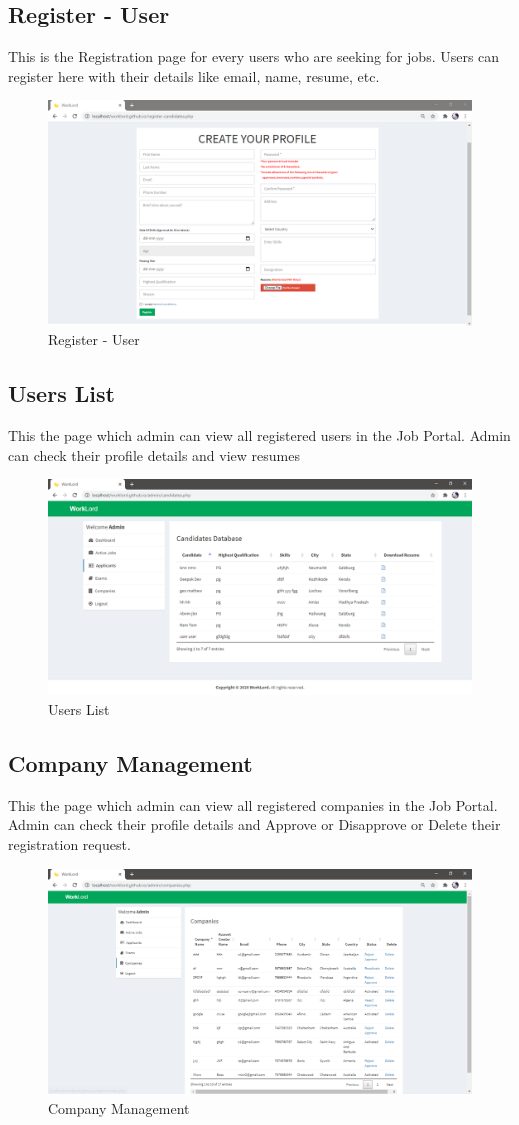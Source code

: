 \documentclass[a4paper,12pt]{report}
\begin{document}
\subsection {Register - User}
This is the Registration page for every users who are seeking for jobs. Users can register here with their details like email, name, resume, etc.
\begin{figure}[bph]
	\centering
	\includegraphics[width=.7\linewidth ]{img/screenshots/user_reg}
	\caption{Register - User}
\end{figure}

\pagebreak

\subsection {Users List}
This the page which admin can view all registered users in the Job Portal. Admin can check their profile details and view resumes
\begin{figure}[bph]
	\centering
	\includegraphics[width=.7\linewidth ]{img/screenshots/admin/users_list}
	\caption{Users List}
\end{figure}

\subsection {Company Management}
This the page which admin can view all registered companies in the Job Portal. Admin can check their profile details and Approve or Disapprove or Delete their registration request.
\begin{figure}[bph]
	\centering
	\includegraphics[width=.7\linewidth ]{img/screenshots/admin/company_mng}
	\caption{Company Management}
\end{figure}
\end{document}
